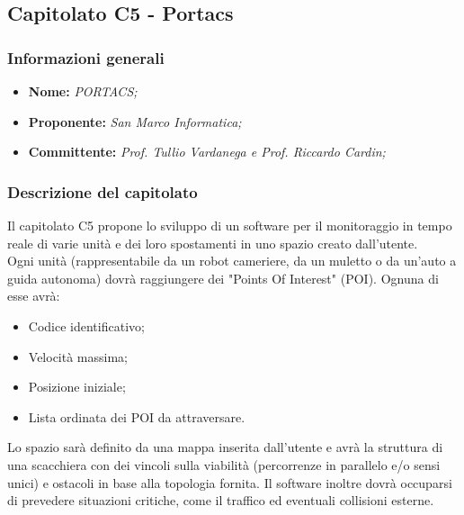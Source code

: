 \subsection{Capitolato C5 - Portacs}
\subsubsection{Informazioni generali}
	\begin{itemize}
	\item \textbf{Nome:} \textit{PORTACS;}
	\item \textbf{Proponente:} \textit{San Marco Informatica;}
	\item \textbf{Committente:}  \textit{Prof. Tullio Vardanega e Prof. Riccardo Cardin;}
	\end{itemize}
\subsubsection{Descrizione del capitolato}
Il capitolato C5 propone lo sviluppo di un software per il monitoraggio in tempo reale di varie unità e dei loro spostamenti in uno spazio creato dall'utente. \\
Ogni unità (rappresentabile da un robot cameriere, da un muletto o da un'auto a guida autonoma) dovrà raggiungere dei "Points Of Interest" (POI).
Ognuna di esse avrà: 
\begin{itemize}
	\item Codice identificativo;
	\item Velocità massima;
	\item Posizione iniziale;
	\item Lista ordinata dei POI da attraversare.
\end{itemize}
Lo spazio sarà definito da una mappa inserita dall'utente e avrà la struttura di una scacchiera con dei vincoli sulla viabilità (percorrenze in parallelo e/o sensi unici) e ostacoli in base alla topologia fornita.
Il software inoltre dovrà occuparsi di prevedere situazioni critiche, come il traffico ed eventuali collisioni esterne.

